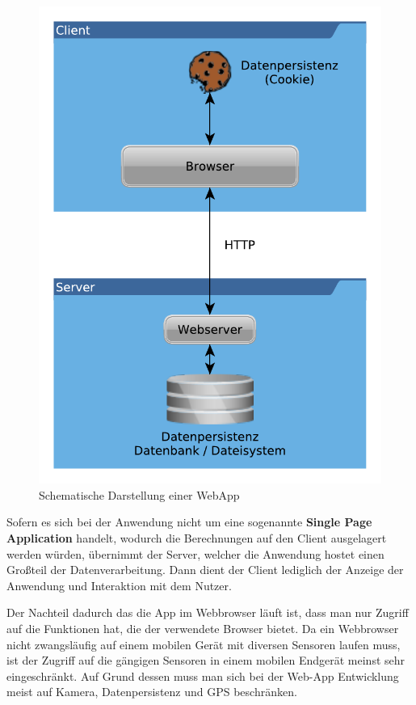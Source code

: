 \begin{figure}[H]
	\centering
	\includegraphics[scale=0.8]{images/Webapps}
	\caption[Schematische Darstellung einer WebApp]{Schematische Darstellung einer WebApp}
	\label{Webapps}
\end{figure}

Sofern es sich bei der Anwendung nicht um eine sogenannte \textbf{Single Page Application} handelt, wodurch die Berechnungen auf den Client ausgelagert werden würden, übernimmt der Server, welcher die Anwendung hostet einen Großteil der Datenverarbeitung. Dann dient der Client lediglich der Anzeige der Anwendung und Interaktion mit dem Nutzer.

Der Nachteil dadurch das die App im Webbrowser läuft ist, dass man nur Zugriff auf die Funktionen hat, die der verwendete Browser bietet. Da ein Webbrowser nicht zwangsläufig auf einem mobilen Gerät mit diversen Sensoren laufen muss, ist der Zugriff auf die gängigen Sensoren in einem mobilen Endgerät meinst sehr eingeschränkt. Auf Grund dessen muss man sich bei der Web-App Entwicklung meist auf Kamera, Datenpersistenz und GPS beschränken.

